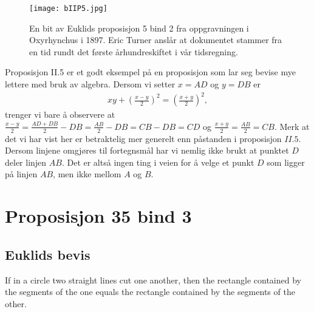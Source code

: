 \documentclass[norsk,twoside,utf8]{article}
\newcommand{\EQU}[1] { \begin{equation*} \begin{split} #1 \end{split} \end{equation*} }
\begin{document}
\begin{figure}[H]
\begin{center}
\texttt{[image: bIIP5.jpg]}
\end{center}
\caption{
En bit av Euklids proposisjon 5 bind 2 fra oppgravningen i Oxyrhynchus i 1897. Eric Turner anslår at dokumentet stammer fra en tid rundt det første århundreskiftet i vår tidsregning\cite{WIKI:Oxyrhynchus}.
}
\label{oppbygg}
\end{figure}

\noindent
Proposisjon II.5 er et godt eksempel på en proposisjon som lar seg bevise mye lettere med bruk av algebra. Dersom vi setter $x=AD$ og $y=DB$ er 
\EQU{
xy+\left(\frac{x-y}{2}\right)^2=\left(\frac{x+y}{2}\right)^2,
}
trenger vi bare å observere at $\frac{x-y}{2}=\frac{AD+DB}{2}-DB=\frac{AB}{2}-DB=CB-DB=CD$ og $\frac{x+y}{2}=\frac{AB}{2}=CB$. Merk at det vi har vist her er betraktelig mer generelt enn påstanden i proposisjon $II.5$. Dersom linjene omgjøres til fortegnsmål har vi nemlig ikke brukt at punktet $D$ deler linjen $AB$. Det er altså ingen ting i veien for å velge et punkt $D$ som ligger på linjen $AB$, men ikke mellom $A$ og $B$.






\section{Proposisjon 35 bind 3}

\subsection{Euklids bevis}

\begin{fquote}[Euklid]
 If in a circle two straight lines cut one another, then the rectangle contained by the segments of the one equals the rectangle contained by the segments of the other.
\end{fquote}
\end{document}
